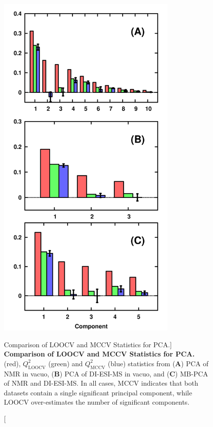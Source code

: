 \begin{figure}
\includegraphics[width=3.5in]{figs/apps/09-rqpca.png}
\caption
      [Comparison of LOOCV and MCCV \qsq{} Statistics for PCA.]{
  {\bf Comparison of LOOCV and MCCV \qsq{} Statistics for PCA.}
  \\
  \rsq{} (red), $Q^2_{\mathrm{LOOCV}}$ (green) and $Q^2_{\mathrm{MCCV}}$ (blue)
  statistics from ({\bf A}) PCA of \hnmr{} NMR in vacuo, ({\bf B}) PCA of
  DI-ESI-MS in vacuo, and ({\bf C}) MB-PCA of \hnmr{} NMR and DI-ESI-MS.
  In all cases, MCCV indicates that both datasets contain a single significant
  principal component, while LOOCV over-estimates the number of significant
  components.
}
\label{figure.4.9}
\end{figure}

